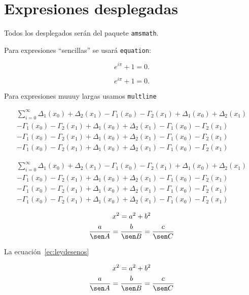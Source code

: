 \section{Expresiones desplegadas}
Todos los desplegados serán del paquete \texttt{amsmath}.

Para expresiones \enquote{sencillas} se usará \texttt{equation}:

\begin{equation}
  e^{i\pi} + 1 = 0.
\end{equation}

\begin{equation*}
  e^{i\pi} + 1 = 0.
\end{equation*}

Para expresiones muuuy largas usamos \texttt{multline}

\begin{multline*}
  \sum_{i=0}^{\infty} \Delta_1(x_0)+\Delta_2(x_1) - \Gamma_1(x_0)-\Gamma_2(x_1) +
  \Delta_1(x_0)+\Delta_2(x_1)\\[-5pt]
  - \Gamma_1(x_0)-\Gamma_2(x_1) +
  \Delta_1(x_0)+\Delta_2(x_1) - \Gamma_1(x_0)-\Gamma_2(x_1)\\[3pt]
  - \Gamma_1(x_0)-\Gamma_2(x_1) +
  \Delta_1(x_0)+\Delta_2(x_1) - \Gamma_1(x_0)-\Gamma_2(x_1)\\[3pt]
  - \Gamma_1(x_0)-\Gamma_2(x_1) +
  \Delta_1(x_0)+\Delta_2(x_1) - \Gamma_1(x_0)-\Gamma_2(x_1)
\end{multline*}

\begin{multline*}
  \sum_{i=0}^{\infty} \Delta_1(x_0)+\Delta_2(x_1) - \Gamma_1(x_0)-\Gamma_2(x_1) +
  \Delta_1(x_0)+\Delta_2(x_1)\\
  - \Gamma_1(x_0)-\Gamma_2(x_1) +
  \Delta_1(x_0)+\Delta_2(x_1) - \Gamma_1(x_0)-\Gamma_2(x_1)\\
  - \Gamma_1(x_0)-\Gamma_2(x_1) +
  \Delta_1(x_0)+\Delta_2(x_1) - \Gamma_1(x_0)-\Gamma_2(x_1)\\
  - \Gamma_1(x_0)-\Gamma_2(x_1) +
  \Delta_1(x_0)+\Delta_2(x_1) - \Gamma_1(x_0)-\Gamma_2(x_1)
\end{multline*}

\begin{gather}
  x^2 = a^2 + b^2 \\
  \frac{a}{\sen A} =\frac{b}{\sen B} = \frac{c}{\sen C} \label{ec:leydesenos}
\end{gather}

La ecuación~\ref{ec:leydesenos}

\begin{equation}
\begin{gathered}
  x^2 = a^2 + b^2 \\
  \frac{a}{\sen A} =\frac{b}{\sen B} = \frac{c}{\sen C} 
\end{gathered}
\end{equation}

